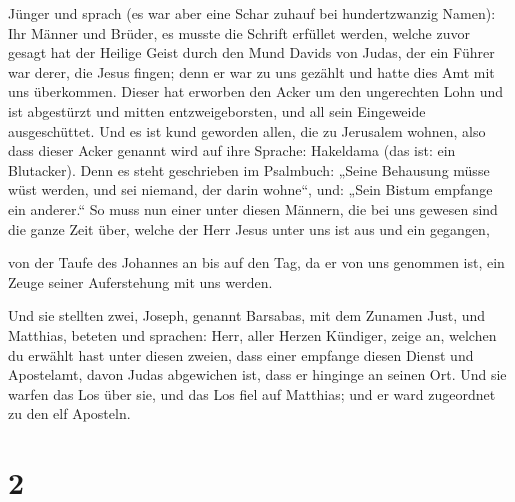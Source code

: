 Jünger und sprach (es war aber eine Schar zuhauf bei hundertzwanzig
Namen):  Ihr Männer und Brüder, es musste die Schrift
erfüllet werden, welche zuvor gesagt hat der Heilige Geist durch den
Mund Davids von Judas, der ein Führer war derer, die Jesus fingen;
 denn er war zu uns gezählt und hatte dies Amt mit uns
überkommen.  Dieser hat erworben den Acker um den
ungerechten Lohn und ist abgestürzt und mitten entzweigeborsten, und all
sein Eingeweide ausgeschüttet.  Und es ist kund geworden
allen, die zu Jerusalem wohnen, also dass dieser Acker genannt wird auf
ihre Sprache: Hakeldama (das ist: ein Blutacker).  Denn
es steht geschrieben im Psalmbuch: „Seine Behausung müsse wüst werden,
und sei niemand, der darin wohne``, und: „Sein Bistum empfange ein
anderer.``  So muss nun einer unter diesen Männern, die
bei uns gewesen sind die ganze Zeit über, welche der Herr Jesus unter
uns ist aus und ein gegangen,

 von der Taufe des Johannes an bis auf den Tag, da er von
uns genommen ist, ein Zeuge seiner Auferstehung mit uns werden.

 Und sie stellten zwei, Joseph, genannt Barsabas, mit dem
Zunamen Just, und Matthias,  beteten und sprachen: Herr,
aller Herzen Kündiger, zeige an, welchen du erwählt hast unter diesen
zweien,  dass einer empfange diesen Dienst und
Apostelamt, davon Judas abgewichen ist, dass er hinginge an seinen Ort.
 Und sie warfen das Los über sie, und das Los fiel auf
Matthias; und er ward zugeordnet zu den elf Aposteln.

\hypertarget{section-1}{%
\section{2}\label{section-1}}

